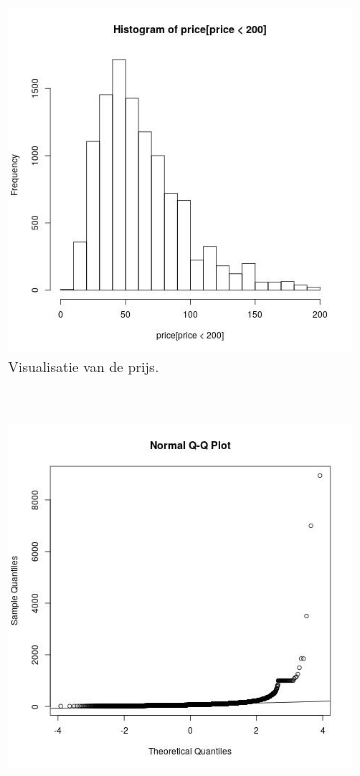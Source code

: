 \documentclass[a4paper,kulak]{kulakarticle} %
\begin{document}
\begin{figure}[H]
	\centering
	\begin{subfigure}[b]{0.45\textwidth}
		\includegraphics[width=\textwidth]{prijsVis.jpg}
		\caption{Visualisatie van de prijs.}
		\label{fig:pv}
	\end{subfigure}
	~ %
	\begin{subfigure}[b]{0.45\textwidth}
		\includegraphics[width=\textwidth]{qqp.jpg}

\end{subfigure}
\end{figure}
\end{document}
